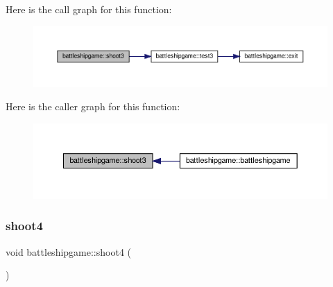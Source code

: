 Here is the call graph for this function\+:
\nopagebreak
\begin{figure}[H]
\begin{center}
\leavevmode
\includegraphics[width=350pt]{classbattleshipgame_afce5fc9dedff42dd1fb8e43bd6dde974_cgraph}
\end{center}
\end{figure}
Here is the caller graph for this function\+:
\nopagebreak
\begin{figure}[H]
\begin{center}
\leavevmode
\includegraphics[width=350pt]{classbattleshipgame_afce5fc9dedff42dd1fb8e43bd6dde974_icgraph}
\end{center}
\end{figure}
\mbox{\label{classbattleshipgame_aa660fbca945531186f483aed25c3f5d7}} 
\subsubsection{\texorpdfstring{shoot4}{shoot4}}
{\footnotesize\ttfamily void battleshipgame\+::shoot4 (\begin{DoxyParamCaption}{ }\end{DoxyParamCaption})\hspace{0.3cm}{\ttfamily [slot]}}

